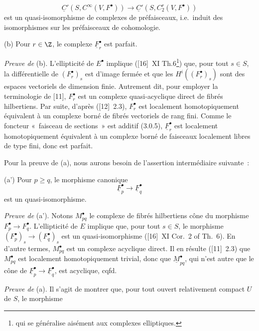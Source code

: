 \[
  \underline C'(S,C^\infty(V,F^\bullet))
  \longrightarrow \underline C'(S,C_2^r(V,F^\bullet))
\]
est un
quasi-isomorphisme de complexes de préfaisceaux, i.e.\ induit des isomorphismes sur les préfaisceaux de cohomologie.

(b) Pour $r\in\Z$, le complexe $\underline F_r^\bullet$ est parfait.

\emph{Preuve de} (b). L'ellipticité de $E^\bullet$ implique ([16]~XI Th.6\footnote{qui se généralise aisément aux complexes elliptiques.}) que, pour tout $s\in S$, la différentielle de $(F_r^\bullet)_s$ est d'image fermée et que les $H^i((F_r^\bullet)_s)$ sont des espaces vectoriels de dimension finie. Autrement dit, pour employer la terminologie de [11], $F_r^\bullet$ est un complexe quasi-acyclique direct de fibrés hilbertiens. Par suite, d'après ([12]~2.3), $F_r^\bullet$ est localement homotopiquement équivalent à un complexe borné de fibrés vectoriels de rang fini. Comme le foncteur «~faisceau de sections~» est additif (3.0.5), $\underline F_r^\bullet$ est localement homotopiquement équivalent à un complexe borné de faisceaux localement libres de type fini, donc est parfait.

Pour la preuve de (a), nous aurons besoin de l'assertion intermédiaire suivante~:

(a') Pour $p\geq q$, le morphisme canonique
\[
  \underline F_p^\bullet\longrightarrow \underline F_q^\bullet
\]
est un quasi-isomorphisme.

\emph{Preuve de} (a'). Notons $M_{pq}^\bullet$ le complexe de fibrés hilbertiens cône du morphisme $F_p^\bullet\longrightarrow F_q^\bullet$. L'ellipticité de $E$ implique que, pour tout $s\in S$, le morphisme $(F_p^\bullet)_s\longrightarrow (F_q^\bullet)_s$ est un quasi-isomorphisme ([16]~XI Cor.~2 of Th.~6). En d'autre termes, $M_{pq}^\bullet$ est un complexe acyclique direct. Il en résulte ([11]~2.3) que $M_{pq}^\bullet$ est localement homotopiquement trivial, donc que $\underline M_{pq}^\bullet$, qui n'est autre que le cône de $\underline F_p^\bullet\longrightarrow\underline F_q^\bullet$, est acyclique, cqfd.

\emph{Preuve de} (a). Il s'agit de montrer que, pour tout ouvert relativement compact $U$ de $S$, le morphisme
